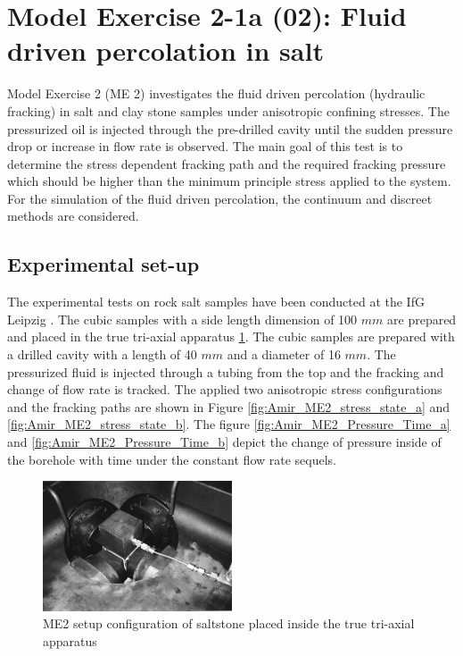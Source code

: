\section{Model Exercise 2-1a (02): Fluid driven percolation in salt}
\label{sec:mex02}
Model Exercise 2 (ME 2) investigates the fluid driven percolation (hydraulic fracking) in salt and clay stone samples under anisotropic confining stresses. The pressurized oil is injected through the pre-drilled cavity until the sudden pressure drop or increase in flow rate is observed. The main goal of this test is to determine the stress dependent fracking path and the required fracking pressure which should be higher than the minimum principle stress applied to the system. For the simulation of the fluid driven percolation, the continuum and discreet methods are considered.
\subsection{Experimental set-up}
The experimental tests on rock salt samples have been conducted at the IfG Leipzig \cite{Kamlot2009}. The cubic samples with a side length dimension of 100 $mm$ are prepared and placed in the true tri-axial apparatus \ref{fig:Amir_ME2_Saltstone_Setup}. The cubic samples are prepared with a drilled cavity with a length of 40 $mm$ and a diameter of 16 $mm$. The pressurized fluid is injected through a tubing from the top and the fracking and change of flow rate is tracked. The applied two anisotropic stress configurations and the fracking paths are shown in  Figure \ref{fig:Amir_ME2_stress_state_a} and \ref{fig:Amir_ME2_stress_state_b}. The figure \ref{fig:Amir_ME2_Pressure_Time_a} and \ref{fig:Amir_ME2_Pressure_Time_b} depict the change of pressure inside of the borehole with time under the constant flow rate sequels.

\begin{figure}[!ht]
\centering
\includegraphics[width=0.5\textwidth]{figures/Amir_ME2_Saltstone_Setup.png}
\caption{ME2 setup configuration of saltstone placed inside the true tri-axial apparatus \cite{Kamlot2009}}
\label{fig:Amir_ME2_Saltstone_Setup}
\end{figure}


